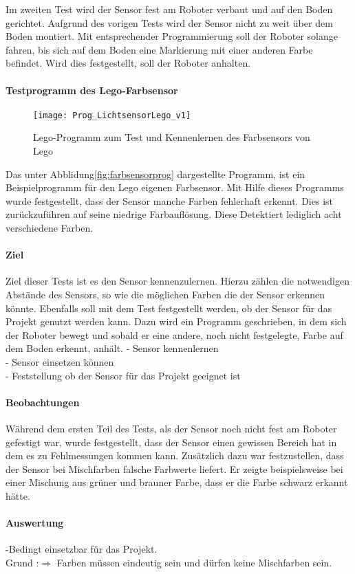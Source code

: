 Im zweiten Test wird der Sensor fest am Roboter verbaut und auf den Boden gerichtet. Aufgrund des vorigen Tests wird der Sensor nicht zu weit über dem Boden montiert. Mit entsprechender Programmierung soll der Roboter solange fahren, bis sich auf dem Boden eine Markierung mit einer anderen Farbe befindet. Wird dies festgestellt, soll der Roboter anhalten.  
\paragraph{Testprogramm des Lego-Farbsensor}
\begin{figure}[htb]
\centering
\texttt{[image: Prog\_LichtsensorLego\_v1]}
\caption{Lego-Programm zum Test und Kennenlernen des Farbsensors von Lego}
\label{fig:farbsensorprog}
\end{figure}
Das unter Abblidung\vref{fig:farbsensorprog} dargestellte Programm, ist ein Beispielprogramm für den Lego eigenen Farbsensor. 
Mit Hilfe dieses Programms wurde festgestellt, dass der Sensor manche Farben fehlerhaft erkennt. Dies ist zurückzuführen auf seine niedrige Farbauflösung. Diese Detektiert lediglich acht verschiedene Farben.
\paragraph{Ziel}
Ziel dieser Tests ist es den Sensor kennenzulernen. Hierzu zählen die notwendigen Abstände des Sensors, so wie die möglichen Farben die der Sensor erkennen könnte.
Ebenfalls soll mit dem Test festgestellt werden, ob der Sensor für das Projekt genutzt werden kann. Dazu wird ein Programm geschrieben, in dem sich der Roboter bewegt und sobald er eine andere, noch nicht festgelegte, Farbe auf dem Boden erkennt, anhält. 
- Sensor kennenlernen\\
- Sensor einsetzen können\\
- Feststellung ob der Sensor für das Projekt geeignet ist

\paragraph{Beobachtungen}
Während dem ersten Teil des Tests, als der Sensor noch nicht fest am Roboter gefestigt war, wurde festgestellt, dass der Sensor einen gewissen Bereich hat in dem es zu Fehlmessungen kommen kann. Zusätzlich dazu war festzustellen, dass der Sensor bei Mischfarben falsche Farbwerte liefert. Er zeigte beispielsweise bei einer Mischung aus grüner und brauner Farbe, dass er die Farbe schwarz erkannt hätte.
\paragraph{Auswertung}
-Bedingt einsetzbar für das Projekt.\\
Grund :$\Rightarrow$ Farben müssen eindeutig sein und dürfen keine Mischfarben sein.



